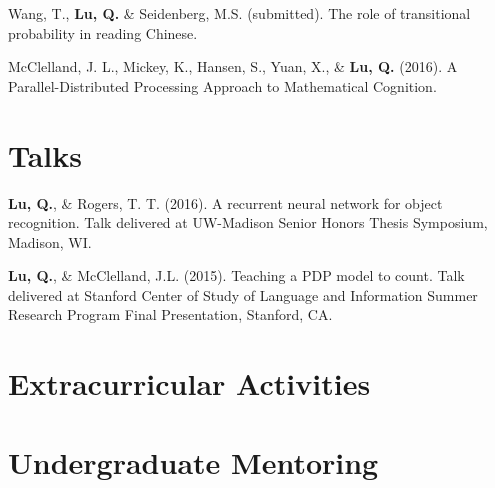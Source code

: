 \documentclass[11pt,a4paper,sans]{moderncv}        %
\begin{document}
\hangindent=0.7cm
Wang, T., \textbf{Lu, Q.} \& Seidenberg, M.S. (submitted). The role of transitional probability in reading Chinese. 

\hangindent=0.7cm
McClelland, J. L., Mickey, K., Hansen, S., Yuan, X., \& \textbf{Lu, Q.} (2016). A Parallel-Distributed Processing Approach to Mathematical Cognition.




\section{Talks}
\hangindent=0.7cm
\textbf{Lu, Q.}, \& Rogers, T. T. (2016). A recurrent neural network for object recognition. Talk delivered at UW-Madison Senior Honors Thesis Symposium, Madison, WI.

\hangindent=0.7cm
\textbf{Lu, Q.}, \& McClelland, J.L. (2015). Teaching a PDP model to count. Talk delivered at Stanford Center of Study of Language and Information Summer Research Program Final Presentation, Stanford, CA. 



\section{Extracurricular Activities}




\section{Undergraduate Mentoring}



\iffalse
\end{document}
